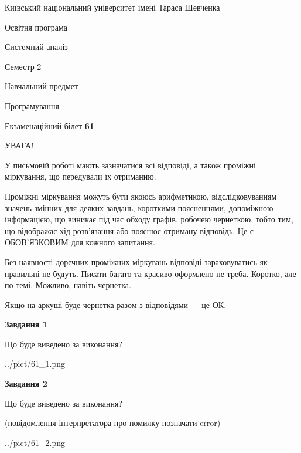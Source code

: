 \documentclass[12pt, ukrainian]{article}
\begin{document}
{{\begin {small}\par
{ \center  Київський національний університет імені Тараса Шевченка \par}
{\parbox {5 cm}{Освітня програма \hfill}{\parbox {7 cm}{Системний аналіз \hfill}}\parbox {6 cm}{\hfill Семестр 2}}\par
{\parbox {5 cm} {Навчальний предмет \hfill}\parbox {7 cm}{Програмування \hfill}\parbox {6cm}{\hfill}\par}\vspace{-7pt} \end{small}}{\center Екзаменаційний білет \No \textbf
{ 61 }\par}}
{
\begin {large}
УВАГА!

У письмовій роботі мають зазначатися всі відповіді, а також проміжні міркування, що передували їх отриманню.

Проміжні міркування можуть бути якоюсь арифметикою, відслідковуванням зна\-чень змінних для деяких завдань,
короткими поясненнями, допоміжною інформацією, що виникає під час обходу графів, робочею чернеткою,
тобто тим, що відображає хід розв’язання або пояснює отриману відповідь.
Це є ОБОВ’ЯЗКОВИМ для кожного запитання.

Без наявності доречних проміжних міркувань відповіді зараховуватись як правиль\-ні не будуть.
Писати багато та красиво оформлено не треба. Коротко, але по темі. Можли\-во, навіть чернетка.

Якщо на аркуші буде чернетка разом з відповідями --- це ОК.

\newpage

{\begin {center}\textbf{Завдання 1}\end {center}}\par
Що буде виведено за виконання?\par
\begin{center}
	{../pict/61_1.png}
\end{center}
\newpage

{\begin {center}\textbf{Завдання 2}\end {center}}\par
Що буде виведено за виконання?\par
 (повідомлення інтерпретатора про помилку позначати error)\par
\begin{center}
	{../pict/61_2.png}
\end{center}
\newpage


\end{large}}
\end{document}
